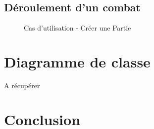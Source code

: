 \documentclass[a4paper,11pt]{article}
\begin{document}
\subsection{Déroulement d'un combat}
\begin{figure}[ht!]
\caption{Cas d'utilisation - Créer une Partie}
\end{figure}

\newpage
\section{Diagramme de classe}
\lipsum[1]

A récupérer
\newpage
\section*{Conclusion}
\lipsum[1-2]
\end{document}
